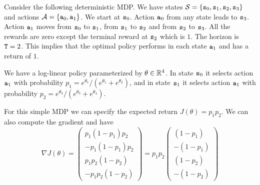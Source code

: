 \begin{example}
Consider the following deterministic MDP. We have states
$\mathcal{S}=\{{\tt s}_0,{\tt s}_1,{\tt s}_2,{\tt s}_3\}$ and actions
$\mathcal{A}=\{{\tt a}_0,{\tt a}_1\}$. We start at ${\tt s}_0$. Action
${\tt a}_0$ from any state leads to ${\tt s}_3$. Action ${\tt a}_1$
moves from ${\tt s}_0$ to ${\tt s}_1$, from ${\tt s}_1$ to ${\tt s}_2$ and from ${\tt s}_2$ to ${\tt s}_3$. All the rewards are zero except the terminal reward at
${\tt s}_2$ which is $1$. The horizon is ${\tt T}=2$. This implies
that the optimal policy performs in each state ${\tt a}_1$ and has a
return of $1$.

We have a log-linear policy parameterized by $\theta\in\mathbb{R}^4$. In
state ${\tt s}_0$ it selects action ${\tt a}_1$ with probability
$p_1=e^{\theta_1}/(e^{\theta_1}+e^{\theta_2})$, and in state
${\tt s}_1$ it selects action ${\tt a}_1$ with probability
$p_2=e^{\theta_3}/(e^{\theta_3}+e^{\theta_4})$.

For this simple MDP we can specify the expected return
$J(\theta)=p_1p_2$. We can also compute the gradient and have
\[
\nabla J(\theta)=\begin{pmatrix}p_1(1-p_1)p_2\\
-p_1(1-p_1)p_2 \\  p_1 p_2 (1-p_2) \\ -p_1 p_2 (1-p_2)\end{pmatrix}= p_1 p_2\begin{pmatrix}(1-p_1)\\
-(1-p_1) \\  (1-p_2) \\ - (1-p_2)\end{pmatrix}
\]


\end{example}
